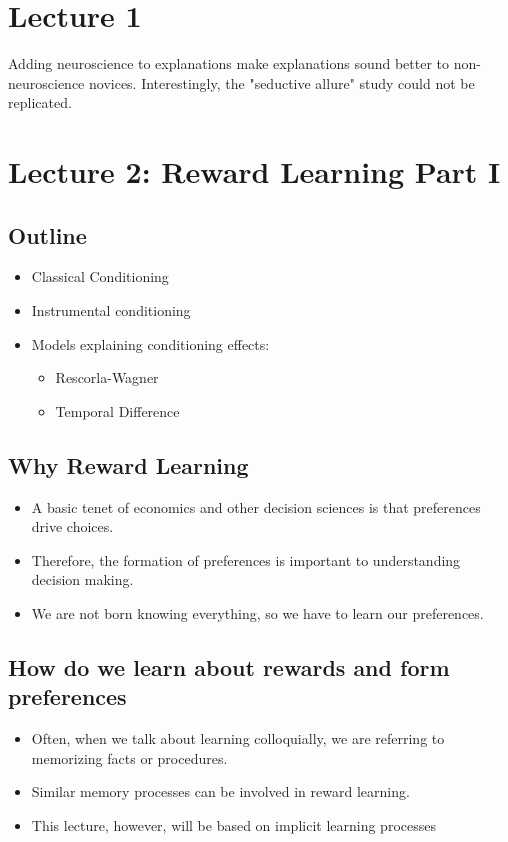 \section{Lecture 1}
Adding neuroscience to explanations make explanations sound better to non-neuroscience novices.
Interestingly, the "seductive allure" study could not be replicated. 

\section{Lecture 2: Reward Learning Part I}
\subsection{Outline}
\begin{itemize}
    \item Classical Conditioning
    \item Instrumental conditioning
    \item Models explaining conditioning effects:
    \begin{itemize}
        \item Rescorla-Wagner
        \item Temporal Difference
    \end{itemize}
\end{itemize}

\subsection{Why Reward Learning}
\begin{itemize}
    \item A basic tenet of economics and other decision sciences is that preferences drive choices.
    \item Therefore, the formation of preferences is important to understanding decision making.
    \item We are not born knowing everything, so we have to learn our preferences.
\end{itemize}

\subsection{How do we learn about rewards and form preferences}
\begin{itemize}
    \item Often, when we talk about learning colloquially, we are referring to memorizing facts or procedures.
    \item Similar memory processes can be involved in reward learning.
    \item This lecture, however, will be based on implicit learning processes
\end{itemize}

